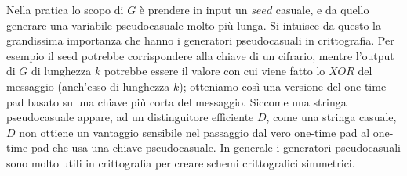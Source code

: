 \documentclass[a4paper,openright,twoside,12pt]{report}
\begin{document}
Nella pratica lo scopo di $G$ \`e prendere in input un $seed$ casuale, e da quello generare una variabile pseudocasuale molto pi\`u lunga. Si intuisce da questo la grandissima
importanza che hanno i generatori pseudocasuali in crittografia. Per esempio il seed potrebbe corrispondere alla chiave di un cifrario, mentre l'output di $G$ di lunghezza $k$ potrebbe
essere il valore con cui viene fatto lo $XOR$ del messaggio (anch'esso di lunghezza $k$); otteniamo cos\`i una versione del one-time pad basato su una chiave pi\`u corta del messaggio.
Siccome una stringa pseudocasuale appare, ad un distinguitore efficiente $D$, come una stringa casuale, $D$ non ottiene un vantaggio sensibile nel passaggio dal vero one-time pad
al one-time pad che usa una chiave pseudocasuale. In generale i generatori pseudocasuali sono molto utili in crittografia per creare schemi crittografici simmetrici.
\end{document}
